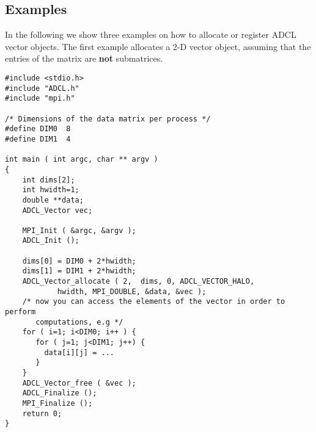\subsection{Examples}
In the following we show three examples on how to allocate or register ADCL
vector objects. The first example allocates a 2-D vector object, assuming that
the entries of the matrix are {\bf not } submatrices.

\begin{verbatim}
#include <stdio.h>
#include "ADCL.h"
#include "mpi.h"

/* Dimensions of the data matrix per process */
#define DIM0  8
#define DIM1  4

int main ( int argc, char ** argv ) 
{
    int dims[2];
    int hwidth=1;
    double **data;
    ADCL_Vector vec;
    
    MPI_Init ( &argc, &argv );
    ADCL_Init ();
    
    dims[0] = DIM0 + 2*hwidth;
    dims[1] = DIM1 + 2*hwidth;
    ADCL_Vector_allocate ( 2,  dims, 0, ADCL_VECTOR_HALO, 
            hwidth, MPI_DOUBLE, &data, &vec );
    /* now you can access the elements of the vector in order to perform 
       computations, e.g */
    for ( i=1; i<DIM0; i++ ) {
       for ( j=1; j<DIM1; j++) {
         data[i][j] = ...
       }
    }
    ADCL_Vector_free ( &vec );
    ADCL_Finalize ();
    MPI_Finalize ();
    return 0;
}
\end{verbatim}

